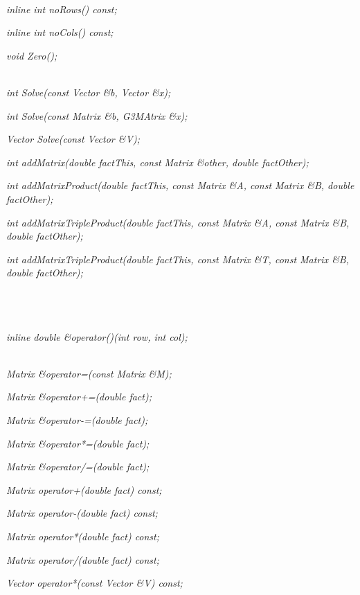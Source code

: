   \\ 
{\em  inline int noRows() const;} 

{\em  inline int noCols() const;} 

{\em  void Zero();} 

 \\
{\em  int Solve(const Vector \&b, Vector \&x);} 

{\em  int Solve(const Matrix \&b, G3MAtrix \&x);} 

{\em  Vector Solve(const Vector \&V);} 

{\em  int addMatrix(double factThis, const Matrix \&other, double factOther);}

{\em  int addMatrixProduct(double factThis, const Matrix \&A, const Matrix \&B, double factOther);}

{\em  int addMatrixTripleProduct(double factThis, const Matrix \&A, const Matrix \&B, double factOther);}

{\em  int addMatrixTripleProduct(double factThis, const Matrix \&T, const Matrix \&B, double factOther);}

\\\\ 
  \\ 
{\em  inline double \&operator()(int row, int col);} 

\\  
{\em  Matrix \&operator=(const Matrix \&M);}

{\em  Matrix \&operator+=(double fact);} 

{\em  Matrix \&operator-=(double fact);} 

{\em  Matrix \&operator*=(double fact);} 

{\em Matrix \&operator/=(double fact); } 

{\em Matrix operator+(double fact) const;} 

{\em Matrix operator-(double fact) const;} 

{\em Matrix operator*(double fact) const;} 

{\em Matrix operator/(double fact) const;} 

{\em Vector operator*(const Vector \&V) const;} 

